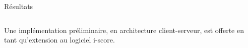 \begin{columns}[t]
\begin{column}{\onecolwid}
\begin{block}{Résultats}
          	\begin{columns}[t]
          		\begin{column}{\onecolwid}\justify
          			Une implémentation préliminaire, en architecture client-serveur, est offerte en tant qu'extension au logiciel i-score.
          		\end{column}
          	\end{columns}        
            \end{block}
        \end{column}         
   \begin{column}{\sepwid}\end{column}		
\end{columns}

